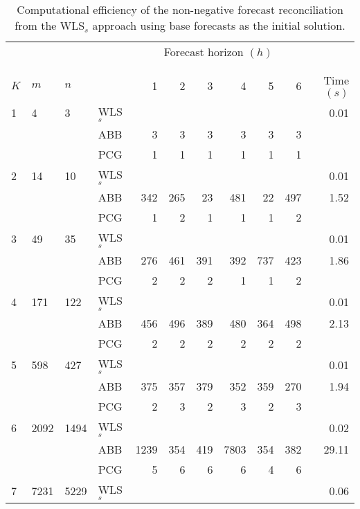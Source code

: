 \documentclass[11pt]{article}
\newcommand{\0}{\phantom{0}}
\begin{document}
\begin{table}[ht]
	\small
	\tabcolsep=0.20cm
	\caption{Computational efficiency of the non-negative forecast reconciliation from the WLS$_{s}$ approach using base forecasts as the initial solution.}
	\label{tbl:perfnnwlsb}
	\centering
	\begin{threeparttable}
		\begin{tabular}{llllrrrrrrr}
			\toprule
			& & & & \multicolumn{6}{c}{Forecast horizon $(h)$}\\[-0.3cm]\\\cline{5-10}\\[-0.3cm]
			$K$ & $m$ & $n$ & & 1 & 2 & 3 & 4 & 5 & 6 & Time $(s)$\\
			\midrule
			1 & 4 & 3 & WLS$_{s}$ & & & & & & & 0.01 \\
			& & & ABB & 3 & 3 & 3 & 3 & 3 & 3 & \pmb{0.04} \\
			& & & PCG & 1 & 1 & 1 & 1 & 1 & 1 & \pmb{0.04} \\
			\midrule
			2 & 14 & 10 & WLS$_{s}$ & & & & & & & 0.01\\
			& & & ABB & 342 & 265 & 23 & 481 & 22 & 497 & 1.52 \\
			& & & PCG & 1 & 2 & 1 & 1 & 1 & 2 & \pmb{$0.10$} \\
			\midrule
			3 & 49 & 35 & WLS$_{s}$ & & & & & & & 0.01 \\
			& & & ABB & 276 & 461 & 391 & 392 & 737 & 423 & 1.86 \\
			& & & PCG & 2 & 2 & 2 & 1 & 1 & 2 & \pmb{$0.17$} \\
			\midrule		
			4 & 171 & 122 & WLS$_{s}$ & & & & & & & 0.01 \\
			& & & ABB & 456 & 496 & 389 & 480 & 364 & 498 & 2.13 \\
			& & & PCG & 2 & 2 & 2 & 2 & 2 & 2 & \pmb{$0.29$} \\
			\midrule
			5 & 598 & 427 & WLS$_{s}$ & & & & & & & 0.01 \\
			& & & ABB & 375 & 357 & 379 & 352 & 359 & 270 & 1.94 \\
			& & & PCG & 2 & 3 & 2 & 3 & 2 & 3 & \pmb{$0.33$} \\
			\midrule		
			6 & 2092 & 1494 & WLS$_{s}$ & & & & & & & 0.02 \\
			& & & ABB & 1239 & 354 & 419 & 7803 & 354 & 382 & 29.11\\
			& & & PCG & 5 & 6 & 6 & 6 & 4 & 6 & \pmb{$0.51$} \\
			\midrule
			7 & 7231 & 5229 & WLS$_{s}$ & & & & & & & 0.06 \\

\end{tabular}
\end{threeparttable}
\end{table}
\end{document}
